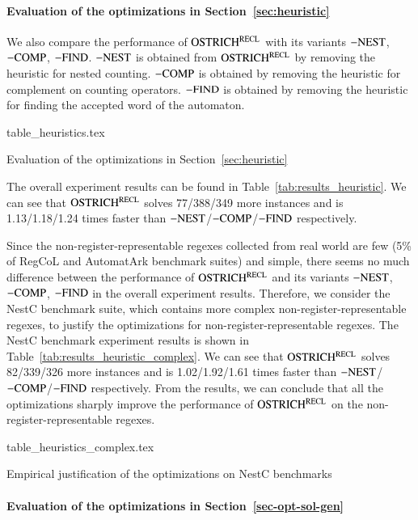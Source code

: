 
\paragraph*{Evaluation of the optimizations in Section~\ref{sec:heuristic}}
%
We also compare the performance of $\rm OSTRICH^{RECL}$ with its variants ${\rm -NEST}$, ${\rm -COMP}$, ${\rm -FIND}$. ${\rm -NEST}$ is obtained from $\rm OSTRICH^{RECL}$ by removing the heuristic for nested counting. ${\rm -COMP}$ is obtained by removing the heuristic for complement on counting operators. ${\rm -FIND}$ is obtained by removing the heuristic for finding the accepted word of the automaton.

\begin{table}
  {table_heuristics.tex}
  \caption{Evaluation of the optimizations in Section~\ref{sec:heuristic}}\label{tab:results_heuristic}
\end{table}

The overall experiment results can be found in Table~\ref{tab:results_heuristic}. We can see that $\rm OSTRICH^{RECL}$ solves 77/388/349 more instances and is 1.13/1.18/1.24 times faster than ${\rm -NEST}$/${\rm -COMP}$/${\rm -FIND}$ respectively. 

Since the non-register-representable regexes collected from real world are few (5\% of RegCoL and AutomatArk benchmark suites) and simple, there seems no much difference between the performance of $\rm OSTRICH^{RECL}$ and its variants ${\rm -NEST}$, ${\rm -COMP}$, ${\rm -FIND}$ in the overall experiment results. Therefore, we consider the NestC benchmark suite, which contains more complex non-register-representable regexes, to justify the optimizations for non-register-representable regexes. The NestC benchmark experiment results is shown in Table~\ref{tab:results_heuristic_complex}. We can see that $\rm OSTRICH^{RECL}$ solves 82/339/326 more instances and is 1.02/1.92/1.61 times faster than ${\rm -NEST}$/${\rm -COMP}$/${\rm -FIND}$ respectively. From the results, we can conclude that all the optimizations sharply improve the performance of $\rm OSTRICH^{RECL}$ on the non-register-representable regexes.

\begin{table}
  {table_heuristics_complex.tex}
  \caption{Empirical justification of the optimizations on NestC benchmarks}\label{tab:results_heuristic_complex}
\end{table}

\paragraph*{Evaluation of the optimizations in Section~\ref{sec-opt-sol-gen}}


